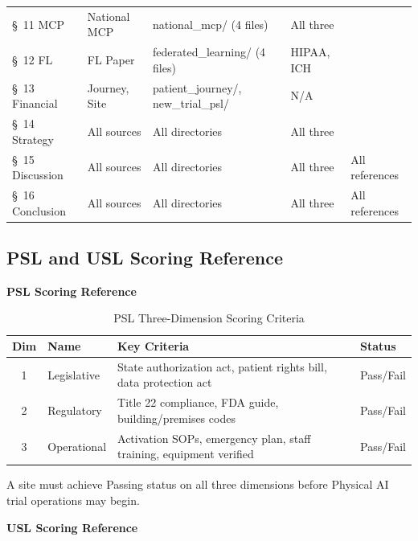 \begin{longtable}{p{2.2cm} p{3cm} p{3.2cm} p{2.3cm} p{3.5cm}}
\S~11 MCP & National MCP & national\_mcp/ (4 files) & All three & \cite{national-mcp-paper, mcp-protocol, mcp-repo} \\
\S~12 FL & FL Paper & federated\_learning/ (4 files) & HIPAA, ICH & \cite{fl-paper, fl-repo, federated-learning-healthcare} \\
\S~13 Financial & Journey, Site & patient\_journey/, new\_trial\_psl/ & N/A & \cite{tufts-delay, nci-trials-paying} \\
\S~14 Strategy & All sources & All directories & All three & \cite{main-repo, mcp-repo, fl-repo} \\
\S~15 Discussion & All sources & All directories & All three & All references \\
\S~16 Conclusion & All sources & All directories & All three & All references \\
\end{longtable}

\newpage

\subsection{PSL and USL Scoring Reference}
\label{app:scoring}

\noindent\textbf{PSL Scoring Reference}

\begin{table}[H]
\centering
\caption{PSL Three-Dimension Scoring Criteria}
\label{tab:psl-scoring}
\small
\begin{tabularx}{\textwidth}{c l X l}
\toprule
\textbf{Dim} & \textbf{Name} & \textbf{Key Criteria} & \textbf{Status} \\
\midrule
1 & Legislative & State authorization act, patient rights bill, data protection act & Pass/Fail \\
2 & Regulatory & Title 22 compliance, FDA guide, building/premises codes & Pass/Fail \\
3 & Operational & Activation SOPs, emergency plan, staff training, equipment verified & Pass/Fail \\
\bottomrule
\end{tabularx}
\end{table}

\noindent A site must achieve Passing status on all three dimensions before
Physical AI trial operations may begin.

\vspace{0.5cm}

\noindent\textbf{USL Scoring Reference}

